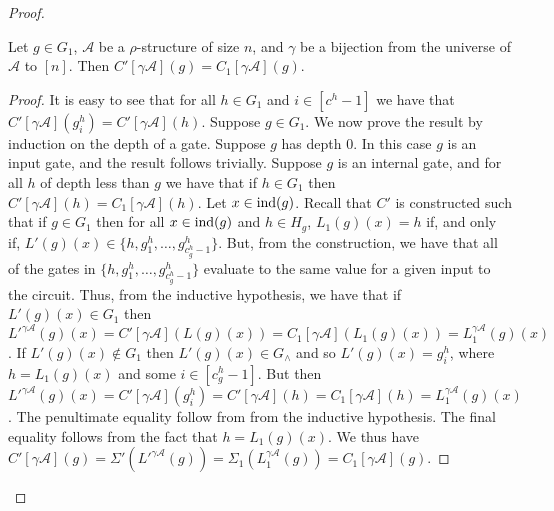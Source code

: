 \documentclass[../paper.tex]{subfiles}
\begin{document}
\begin{proof}
  \begin{claim}
    Let $g \in G_1$, $\mathcal{A}$ be a $\rho$-structure of size $n$, and
    $\gamma$ be a bijection from the universe of $\mathcal{A}$ to $[n]$. Then
    $C'[\gamma \mathcal{A}](g) = C_1[\gamma \mathcal{A}](g)$.
  \end{claim}
  \begin{proof}
    It is easy to see that for all $h \in G_1$ and $i \in [c^h-1]$ we have that
    $C'[\gamma \mathcal{A}](g^h_i) = C'[\gamma \mathcal{A}](h)$. Suppose $g \in
    G_1$. We now prove the result by induction on the depth of a gate. Suppose
    $g$ has depth $0$. In this case $g$ is an input gate, and the result follows
    trivially. Suppose $g$ is an internal gate, and for all $h$ of depth less
    than $g$ we have that if $h \in G_1$ then $C'[\gamma \mathcal{A}](h) =
    C_1[\gamma \mathcal{A}](h)$. Let $x \in \text{\upshape ind}(g)$. Recall that $C'$ is
    constructed such that if $g \in G_1$ then for all $x \in \text{\upshape ind}(g)$ and $h \in
    H_g$, $L_1(g)(x) = h$ if, and only if, $L'(g)(x) \in \{h, g^h_1, \ldots ,
    g^h_{c^h_g - 1}\}$. But, from the construction, we have that all of the
    gates in $\{h, g^h_1, \ldots, g^h_{c^h_g -1}\}$ evaluate to the same value
    for a given input to the circuit. Thus, from the inductive hypothesis, we
    have that if $L'(g)(x) \in G_1$ then $ {L'}^{\gamma \mathcal{A}}(g)(x) =
    C'[\gamma \mathcal{A}](L(g)(x)) = C_1[\gamma \mathcal{A}](L_1(g)(x)) =
    L^{\gamma \mathcal{A}}_1(g)(x) $. If $L'(g)(x) \not\in G_1$ then $L'(g)(x)
    \in G_{\land}$ and so $L'(g)(x) = g^h_i$, where $h = L_1(g)(x)$ and some $i
    \in [c^h_g -1]$. But then ${L'}^{\gamma \mathcal{A}}(g)(x) = C'[\gamma
    \mathcal{A}](g^h_i) = C'[\gamma \mathcal{A}](h) = C_1[\gamma \mathcal{A}](h)
    = L^{\gamma \mathcal{A}}_1(g)(x)$. The penultimate equality follow from from
    the inductive hypothesis. The final equality follows from the fact that $h =
    L_1 (g)(x)$. We thus have $C'[\gamma \mathcal{A}](g) = \Sigma'({L'}^{\gamma
      \mathcal{A}}(g)) = \Sigma_1 (L^{\gamma \mathcal{A}}_1(g)) = C_1[\gamma
    \mathcal{A}](g)$.
  \end{proof}


\end{proof}
\end{document}

